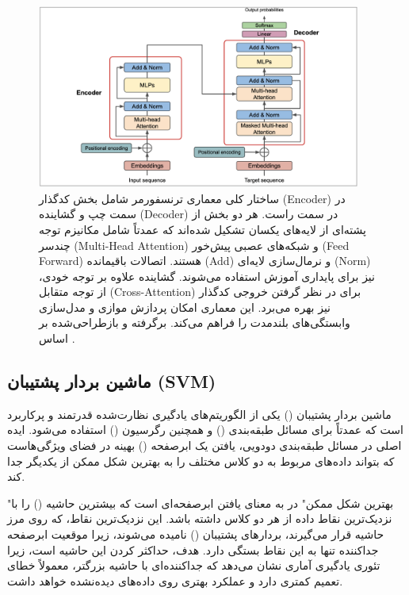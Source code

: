 \begin{figure}[!t]
    \centering
    \includegraphics[width=0.95\textwidth]{images/transformer_structure}
    \caption{ساختار کلی معماری ترنسفورمر شامل بخش کدگذار (Encoder) در سمت چپ و گشاینده (Decoder) در سمت راست. هر دو بخش از پشته‌ای از لایه‌های یکسان تشکیل شده‌اند که عمدتاً شامل مکانیزم توجه چندسر (Multi-Head Attention) و شبکه‌های عصبی پیش‌خور (Feed Forward) هستند. اتصالات باقیمانده (Add) و نرمال‌سازی لایه‌ای (Norm) نیز برای پایداری آموزش استفاده می‌شوند. گشاینده علاوه بر توجه خودی، از توجه متقابل (Cross-Attention) برای در نظر گرفتن خروجی کدگذار نیز بهره می‌برد. این معماری امکان پردازش موازی و مدل‌سازی وابستگی‌های بلندمدت را فراهم می‌کند. برگرفته و بازطراحی‌شده بر اساس \cite{attention}.}
    \label{fig:transformer_structure}
\end{figure}

\subsection{ماشین بردار پشتیبان (SVM)}
ماشین بردار پشتیبان () یکی از الگوریتم‌های یادگیری نظارت‌شده قدرتمند و پرکاربرد است که عمدتاً برای مسائل طبقه‌بندی () و همچنین رگرسیون () استفاده می‌شود. ایده اصلی  در مسائل طبقه‌بندی دودویی، یافتن یک ابرصفحه () بهینه در فضای ویژگی‌هاست که بتواند داده‌های مربوط به دو کلاس مختلف را به بهترین شکل ممکن از یکدیگر جدا کند.

"بهترین شکل ممکن" در  به معنای یافتن ابرصفحه‌ای است که بیشترین حاشیه () را با نزدیک‌ترین نقاط داده از هر دو کلاس داشته باشد. این نزدیک‌ترین نقاط، که روی مرز حاشیه قرار می‌گیرند، بردارهای پشتیبان () نامیده می‌شوند، زیرا موقعیت ابرصفحه جداکننده تنها به این نقاط بستگی دارد. هدف، حداکثر کردن این حاشیه است، زیرا تئوری یادگیری آماری نشان می‌دهد که جداکننده‌ای با حاشیه بزرگتر، معمولاً خطای تعمیم کمتری دارد و عملکرد بهتری روی داده‌های دیده‌نشده خواهد داشت.

